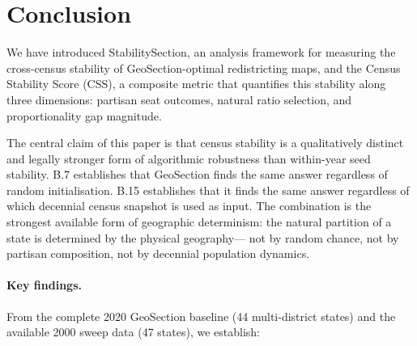 \section{Conclusion}
\label{sec:conclusion}

We have introduced StabilitySection, an analysis framework for measuring the
cross-census stability of GeoSection-optimal redistricting maps, and the
Census Stability Score (CSS), a composite metric that quantifies this stability
along three dimensions: partisan seat outcomes, natural ratio selection, and
proportionality gap magnitude.

The central claim of this paper is that census stability is a qualitatively
distinct and legally stronger form of algorithmic robustness than within-year
seed stability.
B.7 establishes that GeoSection finds the same answer regardless of random
initialisation.
B.15 establishes that it finds the same answer regardless of which decennial
census snapshot is used as input.
The combination is the strongest available form of geographic determinism:
the natural partition of a state is determined by the physical geography---
not by random chance, not by partisan composition, not by decennial population
dynamics.

\paragraph{Key findings.}
From the complete 2020 GeoSection baseline (44 multi-district states) and the
available 2000 sweep data (47 states), we establish:

